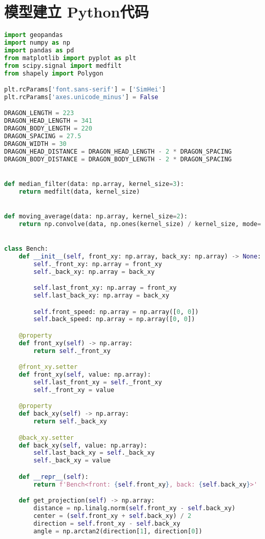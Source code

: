 
\section{模型建立 Python代码}

\begin{lstlisting}[language=python]
import geopandas
import numpy as np
import pandas as pd
from matplotlib import pyplot as plt
from scipy.signal import medfilt
from shapely import Polygon

plt.rcParams['font.sans-serif'] = ['SimHei']
plt.rcParams['axes.unicode_minus'] = False

DRAGON_LENGTH = 223
DRAGON_HEAD_LENGTH = 341
DRAGON_BODY_LENGTH = 220
DRAGON_SPACING = 27.5
DRAGON_WIDTH = 30
DRAGON_HEAD_DISTANCE = DRAGON_HEAD_LENGTH - 2 * DRAGON_SPACING
DRAGON_BODY_DISTANCE = DRAGON_BODY_LENGTH - 2 * DRAGON_SPACING


def median_filter(data: np.array, kernel_size=3):
    return medfilt(data, kernel_size)


def moving_average(data: np.array, kernel_size=2):
    return np.convolve(data, np.ones(kernel_size) / kernel_size, mode='same')


class Bench:
    def __init__(self, front_xy: np.array, back_xy: np.array) -> None:
        self._front_xy: np.array = front_xy
        self._back_xy: np.array = back_xy

        self.last_front_xy: np.array = front_xy
        self.last_back_xy: np.array = back_xy

        self.front_speed: np.array = np.array([0, 0])
        self.back_speed: np.array = np.array([0, 0])

    @property
    def front_xy(self) -> np.array:
        return self._front_xy

    @front_xy.setter
    def front_xy(self, value: np.array):
        self.last_front_xy = self._front_xy
        self._front_xy = value

    @property
    def back_xy(self) -> np.array:
        return self._back_xy

    @back_xy.setter
    def back_xy(self, value: np.array):
        self.last_back_xy = self._back_xy
        self._back_xy = value

    def __repr__(self):
        return f'Bench<front: {self.front_xy}, back: {self.back_xy}>'

    def get_projection(self) -> np.array:
        distance = np.linalg.norm(self.front_xy - self.back_xy)
        center = (self.front_xy + self.back_xy) / 2
        direction = self.front_xy - self.back_xy
        angle = np.arctan2(direction[1], direction[0])


\end{lstlisting}
